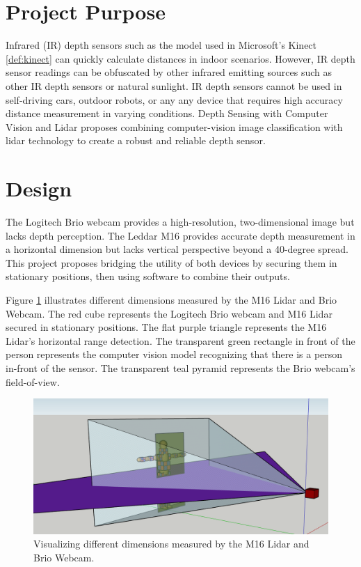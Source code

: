 \documentclass[onecolumn, draftclsnofoot,10pt, compsoc]{IEEEtran}
\makeatletter
\newcommand\captionof[1]{\def\@captype{#1}\caption}
\makeatother
\begin{document}
\begin{singlespace}
		
	\section{Project Purpose}
		Infrared (IR) depth sensors such as the model used in Microsoft's Kinect \ref{def:kinect} can quickly calculate distances in indoor scenarios.
		However, IR depth sensor readings can be obfuscated by other infrared emitting sources such as other IR depth sensors or natural sunlight.
		IR depth sensors cannot be used in self-driving cars, outdoor robots, or any any device that requires high accuracy distance measurement in varying conditions.
		Depth Sensing with Computer Vision and Lidar proposes combining computer-vision image classification with lidar technology to create a robust and reliable depth sensor.

	\section{Design}
		The Logitech Brio webcam provides a high-resolution, two-dimensional image but lacks depth perception.
		The Leddar M16 provides accurate depth measurement in a horizontal dimension but lacks vertical perspective beyond a 40-degree spread.
		This project proposes bridging the utility of both devices by securing them in stationary positions, then using software to combine their outputs.		


		Figure \ref{dimensions} illustrates different dimensions measured by the M16 Lidar and Brio Webcam.
		The red cube represents the Logitech Brio webcam and M16 Lidar secured in stationary positions.
		The flat purple triangle represents the M16 Lidar's horizontal range detection.
		The transparent green rectangle in front of the person represents the computer vision model recognizing that there is a person in-front of the sensor.
		The transparent teal pyramid represents the Brio webcam's field-of-view.
		
		\begin{figure}[H]
			\includegraphics[scale=0.5]{different_dimensions.PNG}
			\captionof{figure}{Visualizing different dimensions measured by the M16 Lidar and Brio Webcam.}
			\label{dimensions}
		\end{figure}



\end{singlespace}
\end{document}
